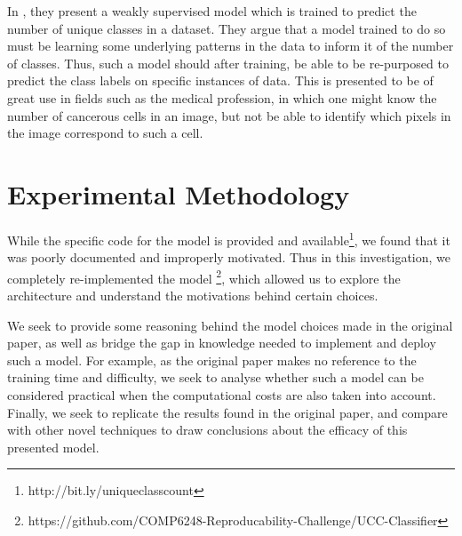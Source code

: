 \documentclass{article} %
\begin{document}
In \cite{Oner2019}, they present a weakly supervised model which is trained to predict the number of unique classes in a dataset. They argue that a model trained to do so must be learning some underlying patterns in the data to inform it of the number of classes. Thus, such a model should after training, be able to be re-purposed to predict the class labels on specific instances of data. This is presented to be of great use in fields such as the medical profession, in which one might know the number of cancerous cells in an image, but not be able to identify which pixels in the image correspond to such a cell. 



\section{Experimental Methodology}
While the specific code for the model is provided and available\footnote{http://bit.ly/uniqueclasscount}, we found that it was poorly documented and improperly motivated. Thus in this investigation, we completely re-implemented the model \footnote{https://github.com/COMP6248-Reproducability-Challenge/UCC-Classifier}, which allowed us to explore the architecture and understand the motivations behind certain choices. 

We seek to provide some reasoning behind the model choices made in the original paper, as well as bridge the gap in knowledge needed to implement and deploy such a model. For example, as the original paper makes no reference to the training time and difficulty, we seek to analyse whether such a model can be considered practical when the computational costs are also taken into account. Finally, we seek to replicate the results found in the original paper, and compare with other novel techniques to draw conclusions about the efficacy of this presented model.
\end{document}
